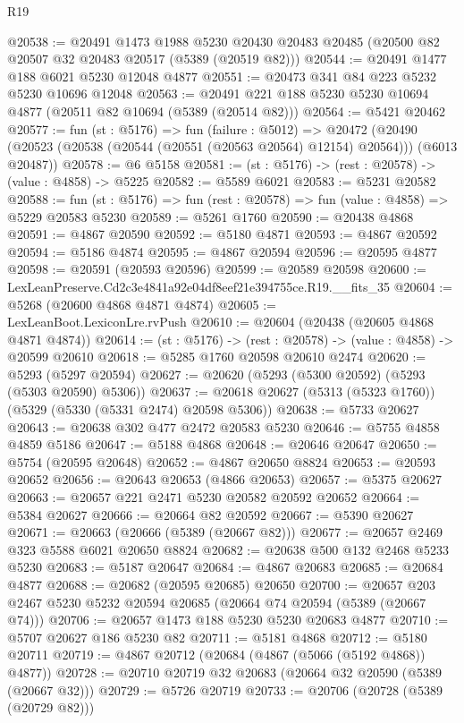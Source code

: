 \begin{lexlean}{R19}
\begin{coremodule}
@20538 := @20491
    @1473
    @1988
    @5230
    @20430
    @20483
    @20485
    (@20500 @82 @20507 @32 @20483 @20517 (@5389 (@20519 @82)))
@20544 := @20491 @1477 @188 @6021 @5230 @12048 @4877
@20551 := @20473 @341 @84 @223 @5232 @5230 @10696 @12048
@20563 := @20491 @221 @188 @5230 @5230 @10694 @4877 (@20511 @82 @10694 (@5389 (@20514 @82)))
@20564 := @5421 @20462
@20577 := fun (st : @5176) =>
  fun (failure : @5012) =>
  @20472 (@20490 (@20523 (@20538 (@20544 (@20551 (@20563 @20564) @12154) @20564))) (@6013 @20487))
@20578 := @6 @5158
@20581 := (st : @5176) -> (rest : @20578) -> (value : @4858) -> @5225
@20582 := @5589 @6021
@20583 := @5231 @20582
@20588 := fun (st : @5176) => fun (rest : @20578) => fun (value : @4858) => @5229 @20583 @5230
@20589 := @5261 @1760
@20590 := @20438 @4868
@20591 := @4867 @20590
@20592 := @5180 @4871
@20593 := @4867 @20592
@20594 := @5186 @4874
@20595 := @4867 @20594
@20596 := @20595 @4877
@20598 := @20591 (@20593 @20596)
@20599 := @20589 @20598
@20600 := LexLeanPreserve.Cd2c3e4841a92e04df8eef21e394755ce.R19.__fits_35
@20604 := @5268 (@20600 @4868 @4871 @4874)
@20605 := LexLeanBoot.LexiconLre.rvPush
@20610 := @20604 (@20438 (@20605 @4868 @4871 @4874))
@20614 := (st : @5176) -> (rest : @20578) -> (value : @4858) -> @20599 @20610
@20618 := @5285 @1760 @20598 @20610 @2474
@20620 := @5293 (@5297 @20594)
@20627 := @20620 (@5293 (@5300 @20592) (@5293 (@5303 @20590) @5306))
@20637 := @20618 @20627 (@5313 (@5323 @1760)) (@5329 (@5330 (@5331 @2474) @20598 @5306))
@20638 := @5733 @20627
@20643 := @20638 @302 @477 @2472 @20583 @5230
@20646 := @5755 @4858 @4859 @5186
@20647 := @5188 @4868
@20648 := @20646 @20647
@20650 := @5754 (@20595 @20648)
@20652 := @4867 @20650 @8824
@20653 := @20593 @20652
@20656 := @20643 @20653 (@4866 @20653)
@20657 := @5375 @20627
@20663 := @20657 @221 @2471 @5230 @20582 @20592 @20652
@20664 := @5384 @20627
@20666 := @20664 @82 @20592
@20667 := @5390 @20627
@20671 := @20663 (@20666 (@5389 (@20667 @82)))
@20677 := @20657 @2469 @323 @5588 @6021 @20650 @8824
@20682 := @20638 @500 @132 @2468 @5233 @5230
@20683 := @5187 @20647
@20684 := @4867 @20683
@20685 := @20684 @4877
@20688 := @20682 (@20595 @20685) @20650
@20700 := @20657 @203 @2467 @5230 @5232 @20594 @20685 (@20664 @74 @20594 (@5389 (@20667 @74)))
@20706 := @20657 @1473 @188 @5230 @5230 @20683 @4877
@20710 := @5707 @20627 @186 @5230 @82
@20711 := @5181 @4868
@20712 := @5180 @20711
@20719 := @4867 @20712 (@20684 (@4867 (@5066 (@5192 @4868)) @4877))
@20728 := @20710 @20719 @32 @20683 (@20664 @32 @20590 (@5389 (@20667 @32)))
@20729 := @5726 @20719
@20733 := @20706 (@20728 (@5389 (@20729 @82)))

\end{coremodule}
\end{lexlean}
